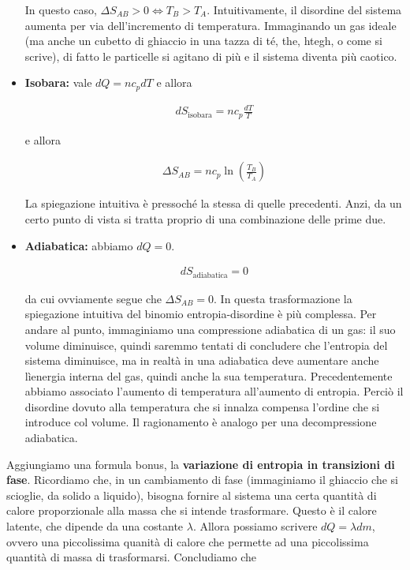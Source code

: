 \begin{itemize}
    \noindent In questo caso, $\Delta S_{AB} > 0 \Longleftrightarrow T_B > T_A$.
    Intuitivamente, il disordine del sistema aumenta per via dell'incremento
    di temperatura. Immaginando un gas ideale (ma anche un cubetto di ghiaccio
    in una tazza di té, the, htegh, o come si scrive), di fatto le particelle
    si agitano di più e il sistema diventa più caotico.

    \item \textbf{Isobara:} vale $dQ = nc_pdT$ e allora
    
    \begin{align}
        dS_\text{isobara} = nc_p\frac{dT}{T}
    \end{align}

    \noindent e allora

    \begin{align}
        \Delta S_{AB} = nc_p\ln\left(\frac{T_B}{T_A}\right)
    \end{align}

    \noindent La spiegazione intuitiva è pressoché la stessa di
    quelle precedenti. Anzi, da un certo punto di vista si tratta
    proprio di una combinazione delle prime due.

    \item \textbf{Adiabatica:} abbiamo $dQ = 0$.
    
    \begin{align}
        dS_\text{adiabatica} = 0
    \end{align}

    \noindent da cui ovviamente segue che $\Delta S_{AB} = 0$.
    In questa trasformazione la spiegazione intuitiva del
    binomio entropia-disordine è più complessa. Per andare al punto,
    immaginiamo una compressione adiabatica di un gas: il suo
    volume diminuisce, quindi saremmo tentati di concludere che
    l'entropia del sistema diminuisce, ma in realtà in una adiabatica
    deve aumentare anche lìenergia interna del gas, quindi anche la
    sua temperatura. Precedentemente abbiamo associato l'aumento di
    temperatura all'aumento di entropia. Perciò il disordine dovuto
    alla temperatura che si innalza compensa l'ordine che si introduce
    col volume. Il ragionamento è analogo per una decompressione
    adiabatica.
\end{itemize}

\noindent Aggiungiamo una formula bonus, la \textbf{variazione di
entropia in transizioni di fase}. Ricordiamo che, in un cambiamento
di fase (immaginiamo il ghiaccio che si scioglie, da solido a liquido),
bisogna fornire al sistema una certa quantità di calore proporzionale
alla massa che si intende trasformare. Questo è il calore latente,
che dipende da una costante $\lambda$. Allora possiamo scrivere
$dQ = \lambda dm$, ovvero una piccolissima quanità di calore che
permette ad una piccolissima quantità di massa di trasformarsi.
Concludiamo che

